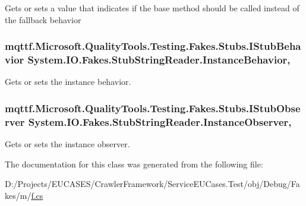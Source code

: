 Gets or sets a value that indicates if the base method should be called instead of the fallback behavior

\hypertarget{class_system_1_1_i_o_1_1_fakes_1_1_stub_string_reader_adf7e22b23ca5e4e32205793f46125705}{
\subsubsection[{Instance\-Behavior}]{\setlength{\rightskip}{0pt plus 5cm}mqttf.\-Microsoft.\-Quality\-Tools.\-Testing.\-Fakes.\-Stubs.\-I\-Stub\-Behavior System.\-I\-O.\-Fakes.\-Stub\-String\-Reader.\-Instance\-Behavior\hspace{0.3cm}{\ttfamily [get]}, {\ttfamily [set]}}}\label{class_system_1_1_i_o_1_1_fakes_1_1_stub_string_reader_adf7e22b23ca5e4e32205793f46125705}


Gets or sets the instance behavior.

\hypertarget{class_system_1_1_i_o_1_1_fakes_1_1_stub_string_reader_addc053636e0c0559b6ad6e9a79b2d613}{
\subsubsection[{Instance\-Observer}]{\setlength{\rightskip}{0pt plus 5cm}mqttf.\-Microsoft.\-Quality\-Tools.\-Testing.\-Fakes.\-Stubs.\-I\-Stub\-Observer System.\-I\-O.\-Fakes.\-Stub\-String\-Reader.\-Instance\-Observer\hspace{0.3cm}{\ttfamily [get]}, {\ttfamily [set]}}}\label{class_system_1_1_i_o_1_1_fakes_1_1_stub_string_reader_addc053636e0c0559b6ad6e9a79b2d613}


Gets or sets the instance observer.



The documentation for this class was generated from the following file\-:\begin{DoxyCompactItemize}
\item 
D\-:/\-Projects/\-E\-U\-C\-A\-S\-E\-S/\-Crawler\-Framework/\-Service\-E\-U\-Cases.\-Test/obj/\-Debug/\-Fakes/m/\hyperlink{m_2f_8cs}{f.\-cs}\end{DoxyCompactItemize}
